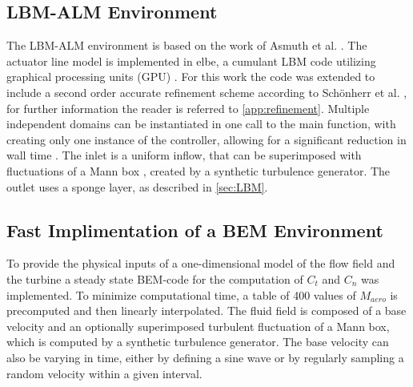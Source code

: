 \subsection{LBM-ALM Environment}
The LBM-ALM environment is based on the work of Asmuth et al. \cite{asmuth_actuator_2020, asmuth_actuator_2019}. The actuator line model is implemented in elbe, a cumulant LBM code  utilizing graphical processing units (GPU) \cite{jansen_validation_2015, gehrke_scrutinizing_2017}. For this work the code was extended to include a second order accurate refinement scheme according to Schönherr et al. \cite{schonherr_towards_2015}, for further information the reader is referred to \autoref{app:refinement}. Multiple independent domains can be instantiated in one call to the main function, with creating only one instance of the controller, allowing for a significant reduction in wall time \cite{rabault_accelerating_2019}. The inlet is a uniform inflow, that can be superimposed with fluctuations of a Mann box \cite{mann_wind_1998}, created by a synthetic turbulence generator. The outlet uses a sponge layer, as described in \autoref{sec:LBM}.
\subsection{Fast Implimentation of a BEM Environment}
To provide the physical inputs of a one-dimensional model of the flow field and the turbine a steady state BEM-code for the computation of $C_t$ and $C_n$ was implemented. To minimize computational time, a table of 400 values of $M_{aero}$ is precomputed and then linearly interpolated. The fluid field is composed of a base velocity and an optionally superimposed turbulent fluctuation of a Mann box, which is computed by a synthetic turbulence generator. The base velocity can also be varying in time, either by defining a sine wave or by regularly sampling a random velocity within a given interval.
